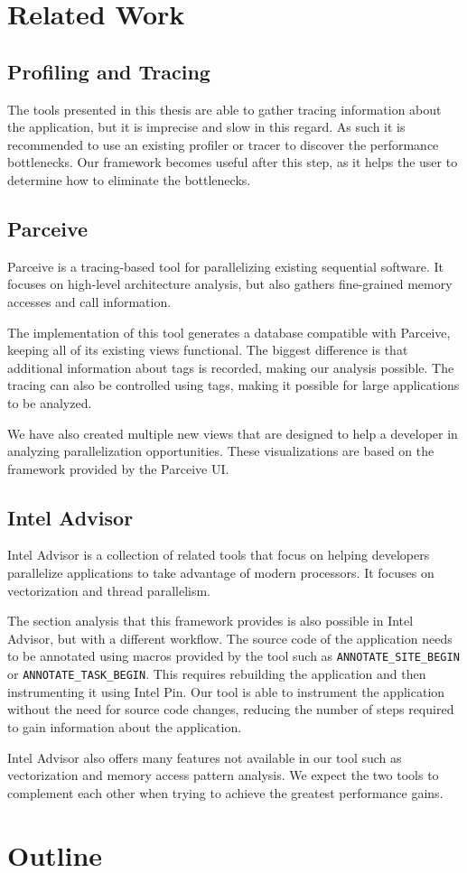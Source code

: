 \section {Related Work}

\subsection{Profiling and Tracing}

The tools presented in this thesis are able to gather tracing information about the application, but it is imprecise and slow in this regard. As such it is recommended to use an existing profiler or tracer to discover the performance bottlenecks. Our framework becomes useful after this step, as it helps the user to determine how to eliminate the bottlenecks.

\subsection{Parceive}

Parceive \cite{parceive} is a tracing-based tool for parallelizing existing sequential software. It focuses on high-level architecture analysis, but also gathers fine-grained memory accesses and call information.

The implementation of this tool generates a database compatible with Parceive, keeping all of its existing views functional. The biggest difference is that additional information about tags is recorded, making our analysis possible. The tracing can also be controlled using tags, making it possible for large applications to be analyzed.

We have also created multiple new views that are designed to help a developer in analyzing parallelization opportunities. These visualizations are based on the framework provided by the Parceive UI.

\subsection{Intel Advisor}

Intel Advisor \cite{inteladvisor} is a collection of related tools that focus on helping developers parallelize applications to take advantage of modern processors. It focuses on vectorization and thread parallelism.

The section analysis that this framework provides is also possible in Intel Advisor, but with a different workflow. The source code of the application needs to be annotated using macros provided by the tool such as \texttt{ANNOTATE\_SITE\_BEGIN} or \texttt{ANNOTATE\_TASK\_BEGIN}. This requires rebuilding the application and then instrumenting it using Intel Pin. Our tool is able to instrument the application without the need for source code changes, reducing the number of steps required to gain information about the application.

Intel Advisor also offers many features not available in our tool such as vectorization and memory access pattern analysis. We expect the two tools to complement each other when trying to achieve the greatest performance gains.

\section {Outline}
